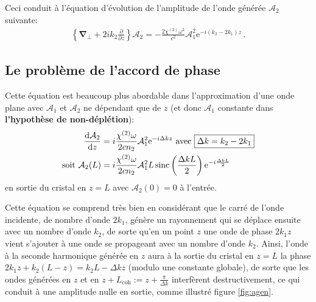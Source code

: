 \documentclass[11pt,a4paper]{article}
\newcommand{\A}{\mathcal{A}}
\newcommand{\e}[1]{\text{e}^{#1}}
\newcommand{\mathsc}[1]{\mathrm{\scriptscriptstyle {#1}}}
\renewcommand{\v}[1]{\boldsymbol{\mathbf{#1}}}
\begin{document}
Ceci conduit à l'équation d'évolution de l'amplitude de l'onde générée $\A_2$ suivante:
\begin{align}
	\left\{\v\nabla_\bot + 2 i k_2 \frac{\partial}{\partial z} \right\} \A_2 = - \frac{2 \chi^{(2)} \omega^2}{c^2} \A_1^2 \e{- i (k_2 - 2k_1) z} \,.
	\label{eq:SHG}
\end{align}

\subsection{Le problème de l'accord de phase}
\label{qpm}
Cette équation est beaucoup plus abordable dans l'approximation d'une onde plane avec $\A_1$ et $\A_2$ ne dépendant que de $z$ (et donc $\A_1$ constante dans \textbf{l'hypothèse de non-déplétion}):
\begin{align}
	\dv{\A_2}{z} &= i\frac{\chi^{(2)}\omega}{2cn_2} \A_1^2 \e{-i \Delta k z} \text{ avec } \boxed{\Delta k = k_2 - 2k_1} \label{eq:pwe} \\
	\text{soit } \A_2(L) &= i \frac{\chi^{(2)}\omega}{2 cn_2} \A_1^2 L \operatorname{sinc}\left( \frac{\Delta k L}{2} \right) \e{-i\frac{\Delta k L}{2}}
\end{align}
en sortie du cristal en $z=L$ avec $\A_2(0)=0$ à l'entrée.

Cette équation se comprend très bien en considérant que le carré de l'onde incidente, de nombre d'onde $2k_1$, génère un rayonnement qui se déplace ensuite avec un nombre d'onde $k_2$, de sorte qu'en un point $z$ une onde de phase $2k_1z$ vient s'ajouter à une onde se propageant avec un nombre d'onde $k_2$. Ainsi, l'onde à la seconde harmonique générée en $z$ aura à la sortie du cristal en $z=L$ la phase $2k_1 z + k_2 (L-z) = k_2 L - \Delta k z$ (modulo une constante globale), de sorte que les ondes générées en $z$ et en $z+L_\mathsc{coh} := z + \frac{\pi}{\Delta k}$ interfèrent destructivement, ce qui conduit à une amplitude nulle en sortie, comme illustré figure \ref{fig:agen}.
\end{document}
